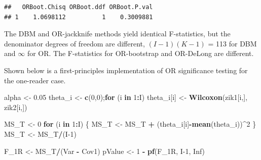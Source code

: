 \documentclass[
]{book}
\newenvironment{Shaded}{\begin{snugshade}}{\end{snugshade}}
\newcommand{\ControlFlowTok}[1]{\textcolor[rgb]{0.13,0.29,0.53}{\textbf{#1}}}
\newcommand{\DecValTok}[1]{\textcolor[rgb]{0.00,0.00,0.81}{#1}}
\newcommand{\FloatTok}[1]{\textcolor[rgb]{0.00,0.00,0.81}{#1}}
\newcommand{\KeywordTok}[1]{\textcolor[rgb]{0.13,0.29,0.53}{\textbf{#1}}}
\newcommand{\NormalTok}[1]{#1}
\newcommand{\OperatorTok}[1]{\textcolor[rgb]{0.81,0.36,0.00}{\textbf{#1}}}
\newcommand{\OtherTok}[1]{\textcolor[rgb]{0.56,0.35,0.01}{#1}}
\newcommand{\StringTok}[1]{\textcolor[rgb]{0.31,0.60,0.02}{#1}}
\begin{document}
\begin{verbatim}
##   ORBoot.Chisq ORBoot.ddf ORBoot.P.val
## 1    1.0698112          1    0.3009881
\end{verbatim}

The DBM and OR-jackknife methods yield identical F-statistics, but the denominator degrees of freedom are different, \((I-1)(K-1)\) = 113 for DBM and \(\infty\) for OR. The F-statistics for OR-bootstrap and OR-DeLong are different.

Shown below is a first-principles implementation of OR significance testing for the one-reader case.

\begin{Shaded}
\begin{Highlighting}[]
\NormalTok{alpha <-}\StringTok{ }\FloatTok{0.05}
\NormalTok{theta_i <-}\StringTok{ }\KeywordTok{c}\NormalTok{(}\DecValTok{0}\NormalTok{,}\DecValTok{0}\NormalTok{);}\ControlFlowTok{for}\NormalTok{ (i }\ControlFlowTok{in} \DecValTok{1}\OperatorTok{:}\NormalTok{I) theta_i[i] <-}\StringTok{ }\KeywordTok{Wilcoxon}\NormalTok{(zik1[i,], zik2[i,])}

\NormalTok{MS_T <-}\StringTok{ }\DecValTok{0}
\ControlFlowTok{for}\NormalTok{ (i }\ControlFlowTok{in} \DecValTok{1}\OperatorTok{:}\NormalTok{I) \{}
\NormalTok{  MS_T <-}\StringTok{ }\NormalTok{MS_T }\OperatorTok{+}\StringTok{ }\NormalTok{(theta_i[i]}\OperatorTok{-}\KeywordTok{mean}\NormalTok{(theta_i))}\OperatorTok{^}\DecValTok{2}
\NormalTok{\}}
\NormalTok{MS_T <-}\StringTok{ }\NormalTok{MS_T}\OperatorTok{/}\NormalTok{(I}\DecValTok{-1}\NormalTok{)}

\NormalTok{F_1R <-}\StringTok{ }\NormalTok{MS_T}\OperatorTok{/}\NormalTok{(Var }\OperatorTok{-}\StringTok{ }\NormalTok{Cov1)}
\NormalTok{pValue <-}\StringTok{ }\DecValTok{1} \OperatorTok{-}\StringTok{ }\KeywordTok{pf}\NormalTok{(F_1R, I}\DecValTok{-1}\NormalTok{, }\OtherTok{Inf}\NormalTok{)}


\end{Highlighting}
\end{Shaded}
\end{document}
